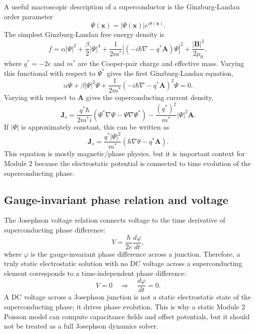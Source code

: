 \documentclass[11pt]{article}
\newcommand{\Bvec}{\mathbf{B}}
\newcommand{\Avec}{\mathbf{A}}
\newcommand{\Jvec}{\mathbf{J}}
\newcommand{\Psisc}{\Psi}
\newcommand{\thetaSC}{\theta}
\begin{document}
A useful macroscopic description of a superconductor is the Ginzburg-Landau order parameter
\begin{equation}
\Psisc(\mathbf{x})=|\Psisc(\mathbf{x})|e^{i\thetaSC(\mathbf{x})}.
\end{equation}
The simplest Ginzburg-Landau free energy density is
\begin{equation}
f = \alpha |\Psisc|^2 + \frac{\beta}{2}|\Psisc|^4
+ \frac{1}{2m^*}\left|\left(-i\hbar\nabla-q^*\Avec\right)\Psisc\right|^2
+ \frac{|\Bvec|^2}{2\mu_0},
\label{eq:gl_free_energy}
\end{equation}
where $q^*=-2e$ and $m^*$ are the Cooper-pair charge and effective mass. Varying this functional with respect to $\Psisc^*$ gives the first Ginzburg-Landau equation,
\begin{equation}
\alpha\Psisc + \beta |\Psisc|^2\Psisc
+ \frac{1}{2m^*}\left(-i\hbar\nabla-q^*\Avec\right)^2\Psisc = 0.
\label{eq:gl_equation}
\end{equation}
Varying with respect to $\Avec$ gives the superconducting current density,
\begin{equation}
\Jvec_s = \frac{q^*\hbar}{2m^* i}\left(\Psisc^*\nabla\Psisc-\Psisc\nabla\Psisc^*\right)
-\frac{(q^*)^2}{m^*}|\Psisc|^2\Avec.
\label{eq:gl_current}
\end{equation}
If $|\Psisc|$ is approximately constant, this can be written as
\begin{equation}
\Jvec_s = \frac{q^* |\Psisc|^2}{m^*}\left(\hbar\nabla\thetaSC-q^*\Avec\right).
\label{eq:phase_current}
\end{equation}
This equation is mostly magnetic/phase physics, but it is important context for Module 2 because the electrostatic potential is connected to time evolution of the superconducting phase.

\subsection{Gauge-invariant phase relation and voltage}

The Josephson voltage relation connects voltage to the time derivative of superconducting phase difference:
\begin{equation}
V = \frac{\hbar}{2e}\frac{d\varphi}{dt},
\label{eq:josephson_voltage}
\end{equation}
where $\varphi$ is the gauge-invariant phase difference across a junction. Therefore, a truly static electrostatic solution with no DC voltage across a superconducting element corresponds to a time-independent phase difference:
\begin{equation}
V=0 \quad \Rightarrow \quad \frac{d\varphi}{dt}=0.
\end{equation}
A DC voltage across a Josephson junction is not a static electrostatic state of the superconducting phase; it drives phase evolution. This is why a static Module 2 Poisson model can compute capacitance fields and offset potentials, but it should not be treated as a full Josephson dynamics solver.
\end{document}
